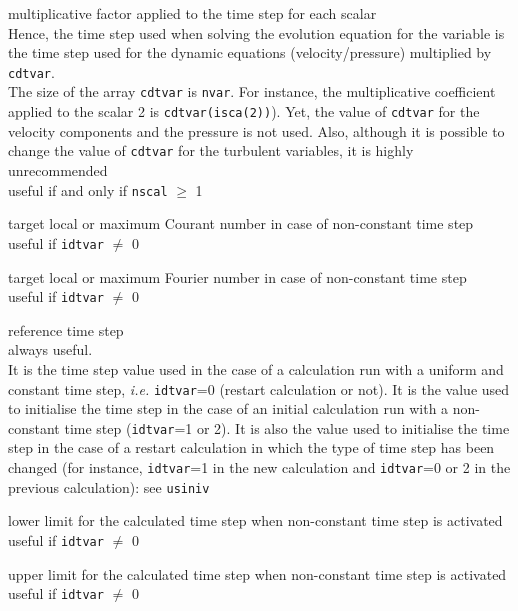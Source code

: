 {multiplicative factor applied to the time step for each scalar\\
Hence, the time step used when solving the evolution equation for the
variable is the time step used for the dynamic equations (velocity/pressure)
multiplied by {\tt cdtvar}.\\
The size of the array {\tt cdtvar} is {\tt nvar}. For instance, the multiplicative
coefficient applied to the scalar 2 is {\tt cdtvar(isca(2))}). Yet, the value of
{\tt cdtvar} for the velocity components and the pressure is not used. Also,
although it is possible to change the value of {\tt cdtvar} for the turbulent
variables, it is highly unrecommended\\
useful if and only if {\tt nscal} $\geqslant$ 1}


{target local or maximum Courant number in case of non-constant time step\\
useful if {\tt idtvar} $\ne$ 0}

{target local or maximum Fourier number in case of non-constant time step\\
useful if {\tt idtvar} $\ne$ 0}

{reference time step \\
always useful.\\
It is the time step value used in the case of a calculation run with a
uniform and constant time step, {\em i.e.} {\tt idtvar}=0 (restart calculation
or not). It is the value used to initialise the time step in the case of
an initial calculation run with a non-constant time step
({\tt idtvar}=1 or 2). It is also the value used to initialise the time step
in the case of a restart calculation in which the type of
time step has been changed (for instance, {\tt idtvar}=1 in the new
calculation and {\tt idtvar}=0 or 2 in the previous calculation): see
\texttt{usiniv}}

{lower limit for the calculated time step when non-constant time step is activated\\
useful if {\tt idtvar} $\ne$ 0}

{upper limit for the calculated time step when non-constant time step is activated\\
useful if {\tt idtvar} $\ne$ 0}

